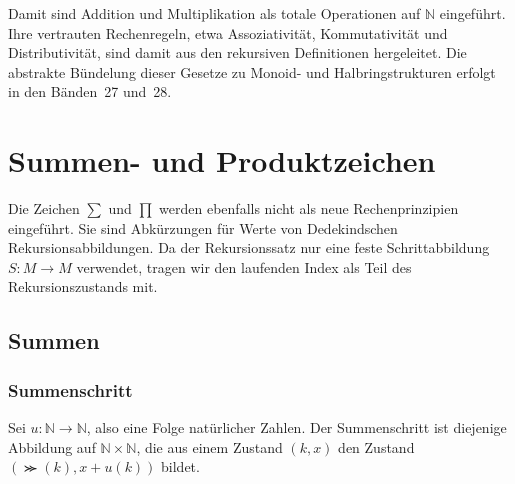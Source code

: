 \documentclass[main.tex]{subfiles}
\begin{document}
\begin{tabproofsplitwide}
  \closeproofpartwide
\end{tabproofsplitwide}

Damit sind Addition und Multiplikation als totale Operationen auf
\(\mathbb{N}\) eingeführt. Ihre vertrauten Rechenregeln, etwa Assoziativität,
Kommutativität und Distributivität, sind damit aus den rekursiven Definitionen
hergeleitet. Die abstrakte Bündelung dieser Gesetze zu Monoid- und
Halbringstrukturen erfolgt in den Bänden~27 und~28.

\section{Summen- und Produktzeichen}

Die Zeichen \(\sum\) und \(\prod\) werden ebenfalls nicht als neue
Rechenprinzipien eingeführt. Sie sind Abkürzungen für Werte von
Dedekindschen Rekursionsabbildungen. Da der Rekursionssatz nur eine feste
Schrittabbildung \(S\colon M\to M\) verwendet, tragen wir den laufenden Index
als Teil des Rekursionszustands mit.

\subsection{Summen}

\subsubsection{Summenschritt}

Sei \(u\colon\mathbb{N}\to\mathbb{N}\), also eine Folge natürlicher Zahlen.
Der Summenschritt ist diejenige Abbildung auf
\(\mathbb{N}\times\mathbb{N}\), die aus einem Zustand \((k,x)\) den Zustand
\((\Succ(k),x + u(k))\) bildet.

\end{document}

